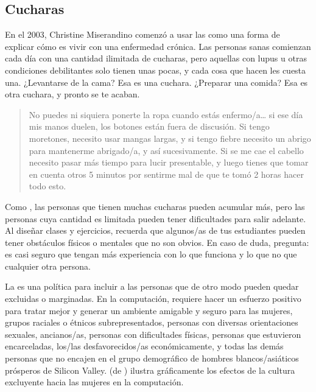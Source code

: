 \subsection*{Cucharas}

En el 2003,
Christine Miserandino comenzó a usar las 
como una forma de explicar cómo es vivir con una enfermedad crónica.
Las personas sanas comienzan cada día con una cantidad ilimitada de cucharas,
pero aquellas con lupus u otras condiciones debilitantes solo tienen unas pocas,
y cada cosa que hacen les cuesta una.
¿Levantarse de la cama?
Esa es una cuchara.
¿Preparar una comida?
Esa es otra cuchara, y pronto se te acaban.

\begin{quote}

  No puedes ni siquiera ponerte la ropa cuando estás enfermo/a{\dots}
  si ese día mis manos duelen, los botones están fuera de discusión.
  Si tengo moretones,
  necesito usar mangas largas,
  y si tengo fiebre necesito un abrigo para mantenerme abrigado/a, y así sucesivamente.
  Si se me cae el cabello necesito pasar más tiempo para lucir presentable,
  y luego tienes que tomar en cuenta otros 5 minutos por sentirme mal
  de que te tomó 2 horas hacer todo esto.

\end{quote}

Como ,
las personas que tienen muchas cucharas pueden acumular más,
pero las personas cuya cantidad es limitada pueden tener dificultades para salir adelante.
Al diseñar clases y ejercicios,
recuerda que algunos/as de tus estudiantes pueden tener obstáculos físicos o mentales que no son obvios.
En caso de duda, pregunta:
es casi seguro que tengan más experiencia con lo que funciona y lo que no que cualquier otra persona.


La  es una política para
incluir a las personas que de otro modo pueden quedar excluidas o marginadas.
En la computación,
requiere hacer un esfuerzo positivo para tratar mejor y generar un ambiente amigable y seguro para las mujeres,
grupos raciales o étnicos subrepresentados,
personas con diversas orientaciones sexuales,
ancianos/as,
personas con dificultades físicas,
personas que estuvieron encarceladas,
los/las desfavorecidos/as económicamente,
y todas las demás personas que no encajen en el grupo demográfico de hombres blancos/asiáticos prósperos de Silicon Valley.
 (de )
ilustra gráficamente los efectos de la cultura excluyente hacia las mujeres en la computación.

